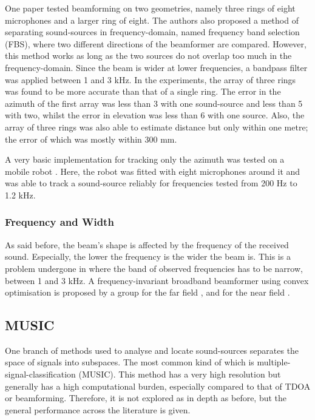 \documentclass{report}
\begin{document}
One paper \cite{tamai_three_2005} tested beamforming on two geometries, namely three rings of eight microphones and a larger ring of eight. The authors also proposed a method of separating sound-sources in frequency-domain, named frequency band selection (FBS), where two different directions of the beamformer are compared. However, this method works as long as the two sources do not overlap too much in the frequency-domain. Since the beam is wider at lower frequencies, a bandpass filter was applied between 1 and 3 \si{kHz}. In the experiments, the array of three rings was found to be more accurate than that of a single ring. The error in the azimuth of the first array was less than 3 \si{\deg} with one sound-source and less than 5 \si{\deg} with two, whilst the error in elevation was less than 6 \si{\deg} with one source. Also, the array of three rings was also able to estimate distance but only within one metre; the error of which was mostly within 300 \si{mm}.

A very basic implementation for tracking only the azimuth was tested on a mobile robot \cite{mattos_passive_2004}. Here, the robot was fitted with eight microphones around it and was able to track a sound-source reliably for frequencies tested from 200 \si{Hz} to 1.2 \si{kHz}.

\subsubsection{Frequency and Width}

As said before, the beam's shape is affected by the frequency of the received sound. Especially, the lower the frequency is the wider the beam is. This is a problem undergone in \cite{tamai_three_2005} where the band of observed frequencies has to be narrow, between 1 and 3 \si{kHz}. A frequency-invariant broadband beamformer using convex optimisation is proposed by a group for the far field \cite{argentieri_experimental_2005}, \cite{argentieri_prototyping_2005} and for the near field \cite{argentieri_modal_2006}.

\subsection{MUSIC}

One branch of methods used to analyse and locate sound-sources separates the space of signals into subspaces. The most common kind of which is multiple-signal-classification (MUSIC). This method has a very high resolution but generally has a high computational burden, especially compared to that of TDOA or beamforming. Therefore, it is not explored as in depth as before, but the general performance across the literature is given.
\end{document}
